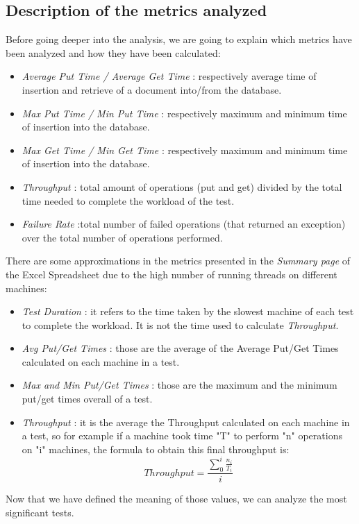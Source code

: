 \subsection{Description of the metrics analyzed}
Before going deeper into the analysis, we are going to explain which metrics have been analyzed and how they have been calculated:
\begin{itemize}
	\item \textit{Average Put Time / Average Get Time} : respectively average time of insertion and retrieve of a document into/from the database.
	\item \textit{Max Put Time / Min Put Time} : respectively maximum and minimum time of insertion into the database.
	\item \textit{Max Get Time / Min Get Time} : respectively maximum and minimum time of insertion into the database.
	\item \textit{Throughput} : total amount of operations (put and get) divided by the total time needed to complete the workload of the test.
	\item \textit{Failure Rate} :total number of failed operations (that returned an exception) over the total number of operations performed.
\end{itemize}
There are some approximations in the metrics presented in the \textit{Summary page} of the Excel Spreadsheet due to the high number of running threads on different machines:
\begin{itemize}
	\item \textit{Test Duration} : it refers to the time taken by the slowest machine of each test to complete the workload. It is not the time used to calculate \textit{Throughput}.
	\item \textit{Avg Put/Get Times} : those are the average of the Average Put/Get Times calculated on each machine in a test.
	\item \textit{Max and Min Put/Get Times} : those are the maximum and the minimum put/get times overall of a test.
	\item \textit{Throughput} : it is the average the Throughput calculated on each machine in a test, so for example if a machine took time "T" to perform "n" operations on "i" machines, the formula to obtain this final throughput is: 
\[Throughput = \frac{\sum_{0}^{i}\frac{n_{i}}{T_{i}}}{i}\]

\end{itemize}
Now that we have defined the meaning of those values, we can analyze the most significant tests.
